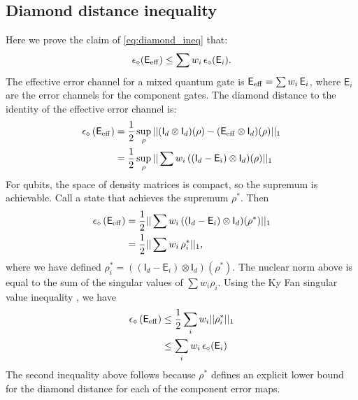 \documentclass[aps,nofootinbib,pra,notitlepage,twocolumn]{revtex4-1}
\begin{document}
\subsection{Diamond distance inequality}
\label{sub:diamond_distance_inequality}
Here we prove the claim of \eqref{eq:diamond_ineq} that:
\begin{equation}
	\epsilon_\diamond\!\left(\mathsf{E}_{\rm eff}\right) \le \sum w_i \, \epsilon_\diamond(\mathsf{E}_i).
\end{equation}
The effective error channel for a mixed quantum gate is $\mathsf{E}_{\rm{eff}} = \sum w_i\,\mathsf{E}_i$, where $\mathsf{E}_i$ are the error channels for the component gates. The diamond distance to the identity of the effective error channel is:
\begin{align}
	\epsilon_\diamond \left(\mathsf{E}_{\rm eff}\right)
		&= \frac{1}{2} \sup_\rho \vert \vert (\mathsf{I}_d\otimes \mathsf{I}_d)(\rho) 
										  - (\mathsf{E}_{\rm eff} \otimes \mathsf{I}_d)(\rho) \vert\vert_1\\
		&= \frac{1}{2} \sup_\rho \vert \vert \sum w_i\,((\mathsf{I}_d
										  - \mathsf{E}_i) \otimes \mathsf{I}_d)(\rho) \vert\vert_1
\end{align}
For qubits, the space of density matrices is compact, so the supremum is achievable. Call a state that achieves the supremum $\rho^*$. Then 
\begin{align}
	\epsilon_\diamond \left(\mathsf{E}_{\rm eff}\right)
		&= \frac{1}{2} \vert \vert \sum w_i\,((\mathsf{I}_d
										  - \mathsf{E}_i) \otimes \mathsf{I}_d)(\rho^*) \vert\vert_1 \\
		&= \frac{1}{2} \vert \vert \sum w_i\, \rho^*_i \vert\vert_1,
\end{align}
where we have defined $\rho^*_i = ((\mathsf{I}_d - \mathsf{E}_i) \otimes \mathsf{I}_d)(\rho^*)$. The nuclear norm above is equal to the sum of the singular values of $\sum w_i \rho_i$. Using the Ky Fan singular value inequality \cite{fan1951maximum} , we have 
\begin{align}
	\epsilon_\diamond \left(\mathsf{E}_{\rm eff}\right)
		&\le \frac{1}{2} \sum_i w_i \vert \vert \rho^*_i \vert\vert_1 \\
		&\le \sum_i w_i\, \epsilon_\diamond(\mathsf{E}_i)
\end{align}
The second inequality above follows because $\rho^*$ defines an explicit lower bound for the diamond distance for each of the component error maps. 
\end{document}
